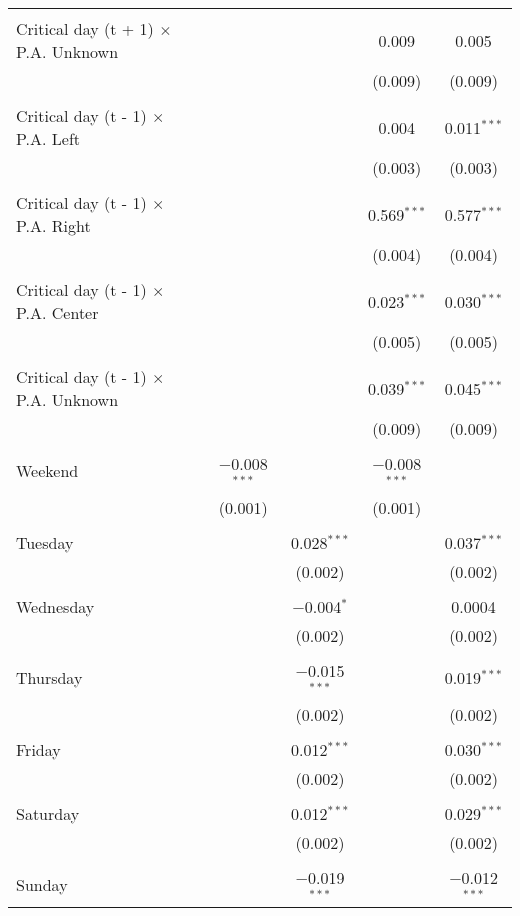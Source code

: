 \documentclass[
]{article}
\begin{document}
\begin{table}[!htbp]
{\begin{tabular}{@{\extracolsep{5pt}}lcccc}
  & & & & \\ 
 Critical day (t + 1) $\times$ P.A. Unknown &  &  & 0.009 & 0.005 \\ 
  &  &  & (0.009) & (0.009) \\ 
  & & & & \\ 
 Critical day (t - 1) $\times$ P.A. Left &  &  & 0.004 & 0.011$^{***}$ \\ 
  &  &  & (0.003) & (0.003) \\ 
  & & & & \\ 
 Critical day (t - 1) $\times$ P.A. Right &  &  & 0.569$^{***}$ & 0.577$^{***}$ \\ 
  &  &  & (0.004) & (0.004) \\ 
  & & & & \\ 
 Critical day (t - 1) $\times$ P.A. Center &  &  & 0.023$^{***}$ & 0.030$^{***}$ \\ 
  &  &  & (0.005) & (0.005) \\ 
  & & & & \\ 
 Critical day (t - 1) $\times$ P.A. Unknown &  &  & 0.039$^{***}$ & 0.045$^{***}$ \\ 
  &  &  & (0.009) & (0.009) \\ 
  & & & & \\ 
 Weekend & $-$0.008$^{***}$ &  & $-$0.008$^{***}$ &  \\ 
  & (0.001) &  & (0.001) &  \\ 
  & & & & \\ 
 Tuesday &  & 0.028$^{***}$ &  & 0.037$^{***}$ \\ 
  &  & (0.002) &  & (0.002) \\ 
  & & & & \\ 
 Wednesday &  & $-$0.004$^{*}$ &  & 0.0004 \\ 
  &  & (0.002) &  & (0.002) \\ 
  & & & & \\ 
 Thursday &  & $-$0.015$^{***}$ &  & 0.019$^{***}$ \\ 
  &  & (0.002) &  & (0.002) \\ 
  & & & & \\ 
 Friday &  & 0.012$^{***}$ &  & 0.030$^{***}$ \\ 
  &  & (0.002) &  & (0.002) \\ 
  & & & & \\ 
 Saturday &  & 0.012$^{***}$ &  & 0.029$^{***}$ \\ 
  &  & (0.002) &  & (0.002) \\ 
  & & & & \\ 
 Sunday &  & $-$0.019$^{***}$ &  & $-$0.012$^{***}$ \\ 

\end{tabular}}
\end{table}
\end{document}
